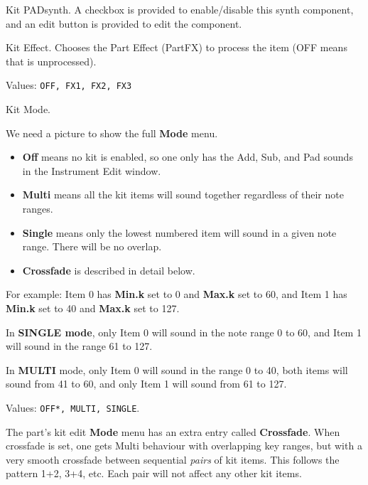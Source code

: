    Kit PADsynth.
   A checkbox is provided to enable/disable this synth component, and
   an edit button is provided to edit the component.

   Kit Effect.
   Chooses the Part Effect (PartFX) to process the item (OFF means that is
   unprocessed). 

   Values: \texttt{OFF, FX1, FX2, FX3}

   Kit Mode.

   We need a picture to show the full \textbf{Mode} menu.

   \begin{itemize}
      \item \textbf{Off} means no kit is enabled, so one only has the Add,
         Sub, and Pad sounds in the Instrument Edit window.
      \item \textbf{Multi} means all the kit items will sound together
         regardless of their note ranges.
      \item \textbf{Single} means only the lowest numbered item will sound
         in a given note range. There will be no overlap.
      \item \textbf{Crossfade} is described in detail below.
   \end{itemize}

   For example:
   Item 0 has \textbf{Min.k} set to 0 and \textbf{Max.k} set to 60, and
   Item 1 has \textbf{Min.k} set to 40 and \textbf{Max.k} set to 127.

   In \textbf{SINGLE mode}, only Item 0 will sound in the note range 0 to
   60, and Item 1 will sound in the range 61 to 127.

   In \textbf{MULTI} mode, only Item 0 will sound in the range 0 to 40, both
   items will sound from 41 to 60, and only Item 1 will sound from 61 to
   127.

   Values: \texttt{OFF*, MULTI, SINGLE}.

   The part's kit edit \textbf{Mode} menu has an extra entry
   called \textbf{Crossfade}.
   When crossfade is set, one gets Multi behaviour with overlapping key
   ranges, but with a very smooth crossfade between sequential \textsl{pairs}
   of kit items. This follows the pattern 1+2, 3+4, etc. Each pair will not
   affect any other kit items.

